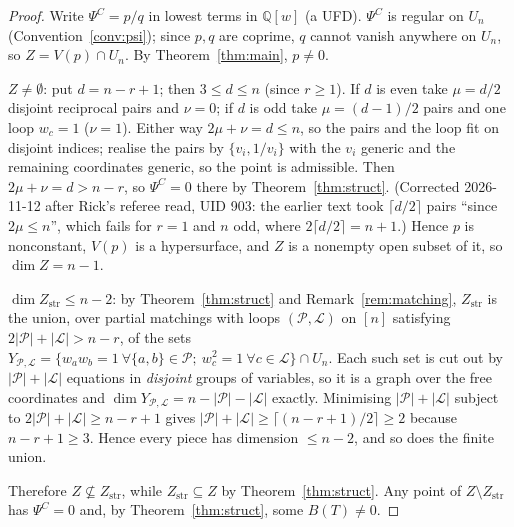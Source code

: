 \documentclass[11pt]{article}
\theoremstyle{definition}
\theoremstyle{remark}
\newcommand{\PsiC}{\Psi^{C}}
\newcommand{\QQ}{\mathbb{Q}}
\begin{document}
\begin{proof}
Write $\PsiC=p/q$ in lowest terms in $\QQ[w]$ (a UFD). $\PsiC$ is regular on
$U_n$ (Convention~\ref{conv:psi}); since $p,q$ are coprime, $q$ cannot vanish
anywhere on $U_n$, so $Z=V(p)\cap U_n$. By Theorem~\ref{thm:main},
$p\ne0$.

$Z\ne\emptyset$: put $d=n-r+1$; then $3\le d\le n$ (since $r\ge1$). If $d$ is
even take $\mu=d/2$ disjoint reciprocal pairs and $\nu=0$; if $d$ is odd take
$\mu=(d-1)/2$ pairs and one loop $w_c=1$ ($\nu=1$). Either way $2\mu+\nu=d\le n$,
so the pairs and the loop fit on disjoint indices; realise the pairs by
$\{v_i,1/v_i\}$ with the $v_i$ generic and the remaining coordinates generic, so
the point is admissible. Then $2\mu+\nu=d>n-r$, so $\PsiC=0$ there by
Theorem~\ref{thm:struct}. (Corrected 2026-11-12 after Rick's referee read, UID 903:
the earlier text took $\lceil d/2\rceil$ pairs ``since $2\mu\le n$'', which fails
for $r=1$ and $n$ odd, where $2\lceil d/2\rceil=n+1$.) Hence
$p$ is nonconstant, $V(p)$ is a hypersurface, and $Z$ is a nonempty open subset
of it, so $\dim Z=n-1$.

$\dim Z_{\mathrm{str}}\le n-2$: by Theorem~\ref{thm:struct} and
Remark~\ref{rem:matching}, $Z_{\mathrm{str}}$ is the union, over partial matchings
with loops $(\mathcal{P},\mathcal{L})$ on $[n]$ satisfying
$2|\mathcal{P}|+|\mathcal{L}|>n-r$, of the sets
$Y_{\mathcal{P},\mathcal{L}}=\{w_aw_b=1\ \forall\{a,b\}\in\mathcal{P};\
w_c^2=1\ \forall c\in\mathcal{L}\}\cap U_n$. Each such set is cut out by
$|\mathcal{P}|+|\mathcal{L}|$ equations in \emph{disjoint} groups of variables, so
it is a graph over the free coordinates and
$\dim Y_{\mathcal{P},\mathcal{L}}=n-|\mathcal{P}|-|\mathcal{L}|$ exactly.
Minimising $|\mathcal{P}|+|\mathcal{L}|$ subject to
$2|\mathcal{P}|+|\mathcal{L}|\ge n-r+1$ gives
$|\mathcal{P}|+|\mathcal{L}|\ge\lceil (n-r+1)/2\rceil\ge 2$ because
$n-r+1\ge3$. Hence every piece has dimension $\le n-2$, and so does the finite
union.

Therefore $Z\not\subseteq Z_{\mathrm{str}}$, while
$Z_{\mathrm{str}}\subseteq Z$ by Theorem~\ref{thm:struct}. Any point of
$Z\setminus Z_{\mathrm{str}}$ has $\PsiC=0$ and, by
Theorem~\ref{thm:struct}, some $B(T)\ne0$.
\end{proof}
\end{document}
